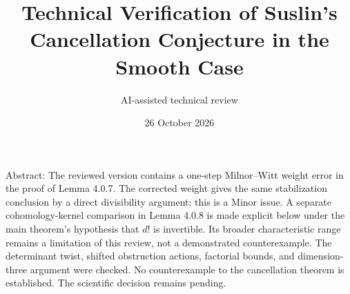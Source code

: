 \documentclass[10pt]{article}
\title{Technical Verification of
Suslin’s Cancellation Conjecture
in the Smooth Case}
\author{AI-assisted technical review}
\date{26 October 2026}
\begin{document}
\maketitle
Abstract: The reviewed version contains a one-step Milnor–Witt weight error in the proof of Lemma 4.0.7. The corrected weight gives the same stabilization conclusion by a direct divisibility argument; this is a Minor issue. A separate cohomology-kernel comparison in Lemma 4.0.8 is made explicit below under the main theorem’s hypothesis that \(d!\) is invertible. Its broader characteristic range remains a limitation of this review, not a demonstrated counterexample. The determinant twist, shifted obstruction actions, factorial bounds, and dimension-three argument were checked. No counterexample to the cancellation theorem is established. The scientific decision remains pending.\par
\end{document}
